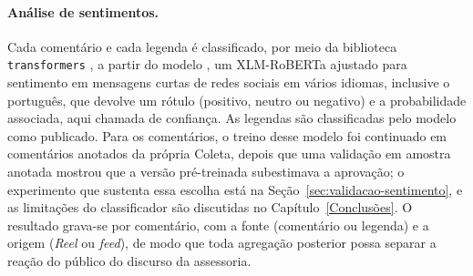 \paragraph*{Análise de sentimentos.} Cada comentário e cada legenda é classificado, por meio da biblioteca \texttt{transformers} \cite{wolf2020}, a partir do modelo  \cite{barbieri2022xlmt}, um XLM-RoBERTa ajustado para sentimento em mensagens curtas de redes sociais em vários idiomas, inclusive o português, que devolve um rótulo (positivo, neutro ou negativo) e a probabilidade associada, aqui chamada de confiança. As legendas são classificadas pelo modelo como publicado. Para os comentários, o treino desse modelo foi continuado em comentários anotados da própria Coleta, depois que uma validação em amostra anotada mostrou que a versão pré-treinada subestimava a aprovação; o experimento que sustenta essa escolha está na Seção~\ref{sec:validacao-sentimento}, e as limitações do classificador são discutidas no Capítulo~\ref{Conclusões}. O resultado grava-se por comentário, com a fonte (comentário ou legenda) e a origem (\emph{Reel} ou \emph{feed}), de modo que toda agregação posterior possa separar a reação do público do discurso da assessoria.

